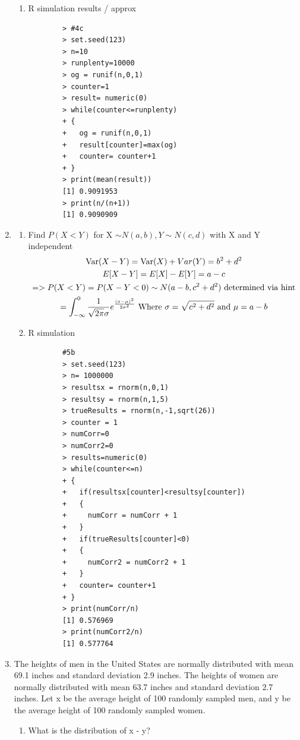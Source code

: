 \documentclass[11pt]{article}
\newcommand{\Var}{\mathop{\rm Var}}
\begin{document}
\begin{enumerate}
\begin{enumerate}
	\item R simulation results / approx
	\begin{verbatim}
		> #4c
		> set.seed(123)
		> n=10
		> runplenty=10000
		> og = runif(n,0,1)
		> counter=1
		> result= numeric(0)
		> while(counter<=runplenty)
		+ {
		+   og = runif(n,0,1)
		+   result[counter]=max(og)
		+   counter= counter+1
		+ }
		> print(mean(result))
		[1] 0.9091953
		> print(n/(n+1))
		[1] 0.9090909
	\end{verbatim}
\end{enumerate}
\item 
\begin{enumerate}
	\item Find $P(X < Y)$ for X $\sim N(a, b), Y \sim N(c, d)$ with X and Y independent
	\begin{gather}
	\Var(X-Y) = \Var(X) + Var(Y) = b^2 + d^2\\
	E[X-Y] = E[X] - E[Y] = a - c\\
	=>	P(X<Y) = P(X-Y < 0) \sim N(a-b,c^2 + d^2) \text{ determined via hint}\\
		= \int_{-\infty}^{0} \frac{1}{\sqrt{2\pi} \sigma} e ^ {\frac{(x-\mu)^2}{2\sigma ^2}} \text{ Where } \sigma = \sqrt{c^2 + d^2} \text{ and } \mu = a-b
	\end{gather}
	\item R simulation
	\begin{verbatim}
		#5b
		> set.seed(123)
		> n= 1000000
		> resultsx = rnorm(n,0,1)
		> resultsy = rnorm(n,1,5)
		> trueResults = rnorm(n,-1,sqrt(26))
		> counter = 1
		> numCorr=0
		> numCorr2=0
		> results=numeric(0) 
		> while(counter<=n)
		+ {
		+   if(resultsx[counter]<resultsy[counter])
		+   {
		+     numCorr = numCorr + 1
		+   }
		+   if(trueResults[counter]<0)
		+   {
		+     numCorr2 = numCorr2 + 1
		+   }
		+   counter= counter+1
		+ }
		> print(numCorr/n)
		[1] 0.576969
		> print(numCorr2/n)
		[1] 0.577764
	\end{verbatim}
\end{enumerate}
\item The heights of men in the United States are normally distributed with mean 69.1 inches and standard deviation
2.9 inches. The heights of women are normally distributed with mean 63.7 inches and standard deviation 2.7 inches. Let x be the average height of 100 randomly sampled men, and y be the average height
of 100 randomly sampled women.
\begin{enumerate}
	\item What is the distribution of x - y?
	\begin{gather}

\end{gather}
\end{enumerate}
\end{enumerate}
\end{document}
